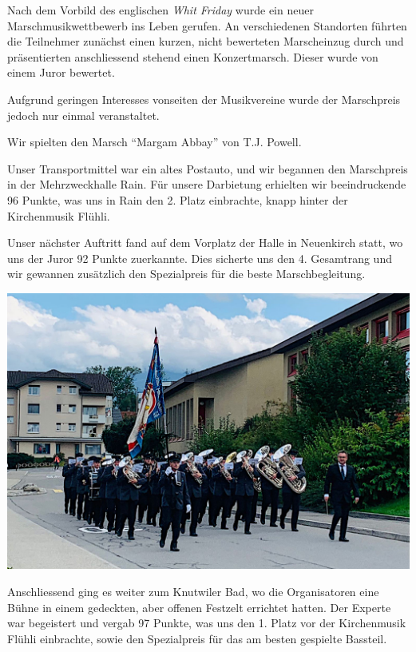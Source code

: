 \begin{history}

    Nach dem Vorbild des englischen \emph{Whit Friday} wurde ein neuer
    Marschmusikwettbewerb ins Leben gerufen. An verschiedenen Standorten führten
    die Teilnehmer zunächst einen kurzen, nicht bewerteten Marscheinzug durch
    und präsentierten anschliessend stehend einen Konzertmarsch. Dieser wurde
    von einem Juror bewertet.

    Aufgrund geringen Interesses vonseiten der Musikvereine wurde der
    Marschpreis jedoch nur einmal veranstaltet.

    \noindent Wir spielten den Marsch \enquote{Margam Abbay} von T.J. Powell.

    Unser Transportmittel war ein altes Postauto, und wir begannen den
    Marschpreis in der Mehrzweckhalle Rain. Für unsere Darbietung erhielten wir
    beeindruckende 96 Punkte, was uns in Rain den 2. Platz einbrachte, knapp
    hinter der Kirchenmusik Flühli.

    Unser nächster Auftritt fand auf dem Vorplatz der Halle in Neuenkirch statt,
    wo uns der Juror 92 Punkte zuerkannte. Dies sicherte uns den 4. Gesamtrang
    und wir gewannen zusätzlich den Spezialpreis für die beste Marschbegleitung.

    \begin{MulticolFigure}
        \centering
        \includegraphics[width=0.93\linewidth]{./chap/2001-2024/2022/Einmarsch-Neuenkirch.jpg}
    \end{MulticolFigure}

    Anschliessend ging es weiter zum Knutwiler Bad, wo die Organisatoren eine
    Bühne in einem gedeckten, aber offenen Festzelt errichtet hatten. Der
    Experte war begeistert und vergab 97 Punkte, was uns den 1. Platz vor der
    Kirchenmusik Flühli einbrachte, sowie den Spezialpreis für das am besten
    gespielte Bassteil.


\end{history}
